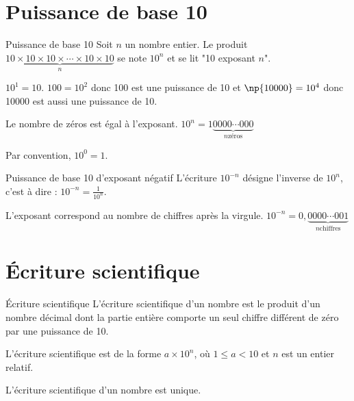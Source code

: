 \begin{pageCours} 

\section{Puissance de base 10}


\begin{DefT}{Puissance de base 10}
Soit $n$ un nombre entier. Le produit $\underbrace{10 \times 10 \times 10 \times \cdots \times 10 \times 10}_n$ se note $10^n$ et se lit "10 exposant $n$". 
\end{DefT}

\begin{Ex}
$10^1 = 10$.  $100 = 10^2$ donc 100 est une puissance de 10 et $\np{10000} = 10^4$ donc 10000 est aussi une puissance de 10. 
\end{Ex}

\begin{Rq}
Le nombre de zéros est égal à l'exposant. $10^n= 1\underbrace{0000 \cdots 000}_{n \text{zéros}}$
\end{Rq}

\begin{Def}
Par convention, $10^0=1$.
\end{Def}




\begin{DefT}{Puissance de base 10 d'exposant négatif}
L'écriture $10^{-n}$ désigne l'inverse de $10^n$, c'est à dire : $10^{-n}= \frac{1}{10^n}$. 
\end{DefT}


\begin{Rq}
L'exposant correspond au nombre de chiffres après la virgule. $10^{-n}= 0,\underbrace{0000 \cdots 001}_{n \text{chiffres}}$
\end{Rq}


\section{Écriture scientifique}

\begin{DefT}{Écriture scientifique}
L'écriture scientifique d'un nombre est le produit d'un nombre décimal dont la partie entière comporte un seul chiffre différent de zéro par une puissance de 10.

L'écriture scientifique est de la forme $a\times 10^n$, où $1 \leq a < 10$ et $n$ est un entier relatif.

L'écriture scientifique d'un nombre est unique.
\end{DefT}



\end{pageCours} 
